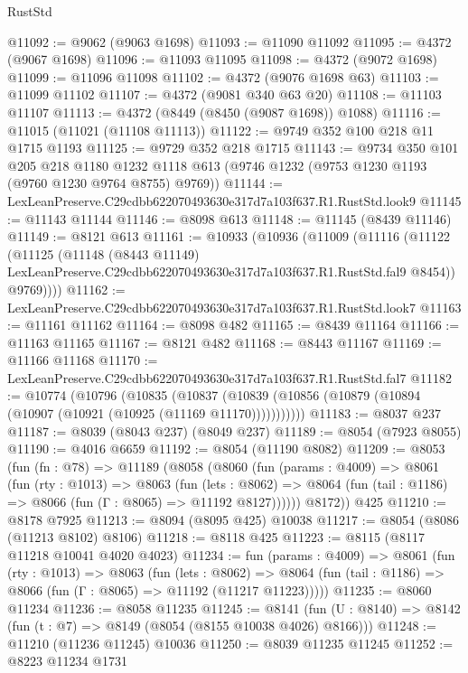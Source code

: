 \begin{lexlean}{RustStd}
\begin{coremodule}
@11092 := @9062 (@9063 @1698)
@11093 := @11090 @11092
@11095 := @4372 (@9067 @1698)
@11096 := @11093 @11095
@11098 := @4372 (@9072 @1698)
@11099 := @11096 @11098
@11102 := @4372 (@9076 @1698 @63)
@11103 := @11099 @11102
@11107 := @4372 (@9081 @340 @63 @20)
@11108 := @11103 @11107
@11113 := @4372 (@8449 (@8450 (@9087 @1698)) @1088)
@11116 := @11015 (@11021 (@11108 @11113))
@11122 := @9749 @352 @100 @218 @11 @1715 @1193
@11125 := @9729 @352 @218 @1715
@11143 := @9734
    @350
    @101
    @205
    @218
    @1180
    @1232
    @1118
    @613
    (@9746 @1232 (@9753 @1230 @1193 (@9760 @1230 @9764 @8755) @9769))
@11144 := LexLeanPreserve.C29cdbb622070493630e317d7a103f637.R1.RustStd.look9
@11145 := @11143 @11144
@11146 := @8098 @613
@11148 := @11145 (@8439 @11146)
@11149 := @8121 @613
@11161 := @10933
    (@10936
      (@11009
        (@11116
          (@11122
            (@11125
              (@11148
                (@8443 @11149)
                LexLeanPreserve.C29cdbb622070493630e317d7a103f637.R1.RustStd.fal9
                @8454))
            @9769))))
@11162 := LexLeanPreserve.C29cdbb622070493630e317d7a103f637.R1.RustStd.look7
@11163 := @11161 @11162
@11164 := @8098 @482
@11165 := @8439 @11164
@11166 := @11163 @11165
@11167 := @8121 @482
@11168 := @8443 @11167
@11169 := @11166 @11168
@11170 := LexLeanPreserve.C29cdbb622070493630e317d7a103f637.R1.RustStd.fal7
@11182 := @10774
    (@10796
      (@10835
        (@10837 (@10839 (@10856 (@10879 (@10894 (@10907 (@10921 (@10925 (@11169 @11170)))))))))))
@11183 := @8037 @237
@11187 := @8039 (@8043 @237) (@8049 @237)
@11189 := @8054 (@7923 @8055)
@11190 := @4016 @6659
@11192 := @8054 (@11190 @8082)
@11209 := @8053
    (fun (fn : @78) =>
    @11189
      (@8058
        (@8060
          (fun (params : @4009) =>
          @8061
            (fun (rty : @1013) =>
            @8063
              (fun (lets : @8062) =>
              @8064 (fun (tail : @1186) => @8066 (fun (Γ : @8065) => @11192 @8127))))))
        @8172))
    @425
@11210 := @8178 @7925
@11213 := @8094 (@8095 @425) @10038
@11217 := @8054 (@8086 (@11213 @8102) @8106)
@11218 := @8118 @425
@11223 := @8115 (@8117 @11218 @10041 @4020 @4023)
@11234 := fun (params : @4009) =>
  @8061
    (fun (rty : @1013) =>
    @8063
      (fun (lets : @8062) =>
      @8064 (fun (tail : @1186) => @8066 (fun (Γ : @8065) => @11192 (@11217 @11223)))))
@11235 := @8060 @11234
@11236 := @8058 @11235
@11245 := @8141
    (fun (U : @8140) => @8142 (fun (t : @7) => @8149 (@8054 (@8155 @10038 @4026) @8166)))
@11248 := @11210 (@11236 @11245) @10036
@11250 := @8039 @11235 @11245
@11252 := @8223 @11234 @1731

\end{coremodule}
\end{lexlean}
